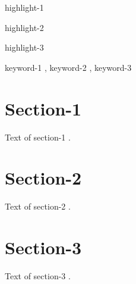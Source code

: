 \documentclass[a4paper,fleqn]{cas-sc}
\begin{document}

\begin{highlights}
\item highlight-1
\item highlight-2
\item highlight-3
\end{highlights}

\begin{keywords}
keyword-1 \sep 
keyword-2 \sep 
keyword-3
\end{keywords}

\maketitle

\section{Section-1}

Text of section-1 \cite{Fortunato2010}.

\section{Section-2}

Text of section-2 \cite{NewmanGirvan2004}.

\section{Section-3}

Text of section-3 \cite{Vehlowetal2013}.


\end{document}
